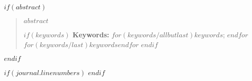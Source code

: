 \maketitle

$if(abstract)$
\begin{abstract}
$abstract$

\vspace{2ex}

$if(keywords)$
\textbf{Keywords:} $for(keywords/allbutlast)$$keywords$; $endfor$$for(keywords/last)$$keywords$$endfor$
$endif$

\end{abstract}
$endif$

$if(journal.linenumbers)$
\linenumbers
$endif$
